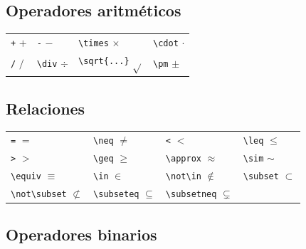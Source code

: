 \documentclass[
  a4paper,
]{scrreport}
\begin{document}
\hypertarget{operadores-aritmuxe9ticos}{%
\subsection{Operadores aritméticos}\label{operadores-aritmuxe9ticos}}

\begin{longtable}[]{@{}llll@{}}
\toprule()
\endhead
\texttt{+} \(+\) & \texttt{-} \(-\) & \texttt{\textbackslash{}times}
\(\times\) & \texttt{\textbackslash{}cdot} \(\cdot\) \\
\texttt{/} \(/\) & \texttt{\textbackslash{}div} \(\div\) &
\texttt{\textbackslash{}sqrt\{...\}} \(\sqrt{}\) &
\texttt{\textbackslash{}pm} \(\pm\) \\
\bottomrule()
\end{longtable}

\hypertarget{relaciones}{%
\subsection{Relaciones}\label{relaciones}}

\begin{longtable}[]{@{}
  >{\raggedright\arraybackslash}p{}
  >{\raggedright\arraybackslash}p{}
  >{\raggedright\arraybackslash}p{}
  >{\raggedright\arraybackslash}p{}@{}}
\toprule()
\endhead
\texttt{=} \(=\) & \texttt{\textbackslash{}neq} \(\neq\) &
\texttt{\textless{}} \(<\) & \texttt{\textbackslash{}leq} \(\leq\) \\
\texttt{\textgreater{}} \(>\) & \texttt{\textbackslash{}geq} \(\geq\) &
\texttt{\textbackslash{}approx} \(\approx\) &
\texttt{\textbackslash{}sim} \(\sim\) \\
\texttt{\textbackslash{}equiv} \(\equiv\) & \texttt{\textbackslash{}in}
\(\in\) & \texttt{\textbackslash{}not\textbackslash{}in} \(\not\in\) &
\texttt{\textbackslash{}subset} \(\subset\) \\
\texttt{\textbackslash{}not\textbackslash{}subset} \(\not\subset\) &
\texttt{\textbackslash{}subseteq} \(\subseteq\) &
\texttt{\textbackslash{}subsetneq} \(\subsetneq\) & \\
\bottomrule()
\end{longtable}

\hypertarget{operadores-binarios}{%
\subsection{Operadores binarios}\label{operadores-binarios}}
\end{document}
